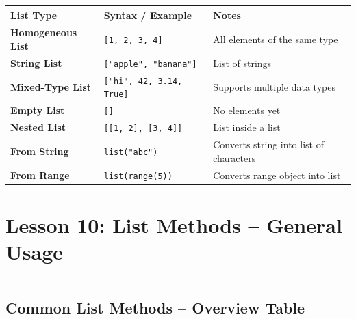 \documentclass[a4paper,11pt]{article}
\begin{document}
	\begin{tabular}{>{\bfseries}p{4.2cm} p{7cm} p{2.8cm}}
		\toprule
		List Type & Syntax / Example & Notes \\
		\midrule
		
		Homogeneous List & \texttt{[1, 2, 3, 4]} & All elements of the same type \\
		
		String List & \texttt{["apple", "banana"]} & List of strings \\
		
		Mixed-Type List & \texttt{["hi", 42, 3.14, True]} & Supports multiple data types \\
		
		Empty List & \texttt{[]} & No elements yet \\
		
		Nested List & \texttt{[[1, 2], [3, 4]]} & List inside a list \\
		
		From String & \texttt{list("abc")} & Converts string into list of characters \\
		
		From Range & \texttt{list(range(5))} & Converts range object into list \\
		
		\bottomrule
	\end{tabular}
	
	\section{Lesson 10: List Methods – General Usage}
	\inputminted{python}{Python_Files/list_methods_general.py}
	
	\vspace{1em}
	\subsection*{Common List Methods – Overview Table}
	
\end{document}

